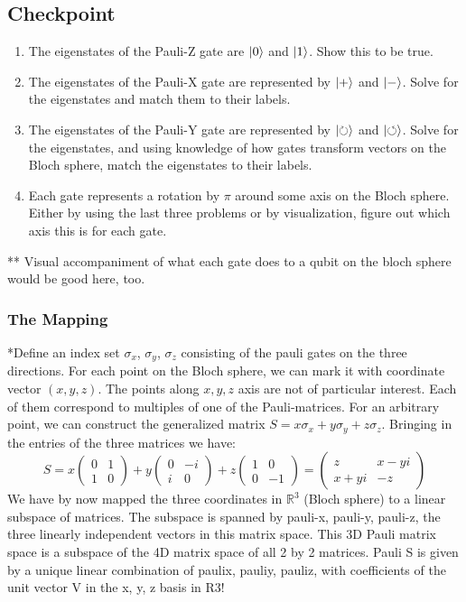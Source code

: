 \documentclass[12pt]{article}
\begin{document}
\subsection{Checkpoint}
\begin{enumerate}
    \item The eigenstates of the Pauli-Z gate are $\ket{0}$ and $\ket{1}$. Show this to be true.
    \item The eigenstates of the Pauli-X gate are represented by $\ket{+}$ and $\ket{-}$. Solve for the eigenstates and match them to their labels.
    \item The eigenstates of the Pauli-Y gate are represented by $\ket{\circlearrowright}$ and $\ket{\circlearrowleft}$. Solve for the eigenstates, and using knowledge of how gates transform vectors on the Bloch sphere, match the eigenstates to their labels.
    \item Each gate represents a rotation by $\pi$ around some axis on the Bloch sphere. Either by using the last three problems or by visualization, figure out which axis this is for each gate.
\end{enumerate}

** Visual accompaniment of what each gate does to a qubit on the bloch sphere would be good here, too.

\subsubsection{The Mapping}

*Define an index set {$\sigma_x$, $\sigma_y$, $\sigma_z$} consisting of the pauli gates on the three directions.
For each point on the Bloch sphere, we can mark it with coordinate vector $(x,y,z)$. The points along $x,y,z$ axis are not of particular interest. Each of them correspond to multiples of one of the Pauli-matrices. For an arbitrary point, we can construct the generalized matrix $S=x\sigma_x+y\sigma_y+z\sigma_z$. Bringing in the entries of the three matrices we have:
$$S=x\begin{pmatrix}
0 & 1\\
1 & 0
\end{pmatrix}+y\begin{pmatrix}
0 & -i\\
i & 0
\end{pmatrix}+z\begin{pmatrix}
1 & 0\\
0 & -1
\end{pmatrix}=\begin{pmatrix}
z & x-yi\\
x+yi & -z
\end{pmatrix}$$
We have by now mapped the three coordinates in $\mathbb{R}^3$ (Bloch sphere) to a linear subspace of matrices. The subspace is spanned by pauli-x, pauli-y, pauli-z, the three linearly independent vectors in this matrix space. This 3D Pauli matrix space is a subspace of the 4D matrix space of all 2 by 2 matrices.  Pauli S is given by a unique linear combination of paulix, pauliy, pauliz, with coefficients of the unit vector V in the x, y, z basis in R3!\\
\end{document}
